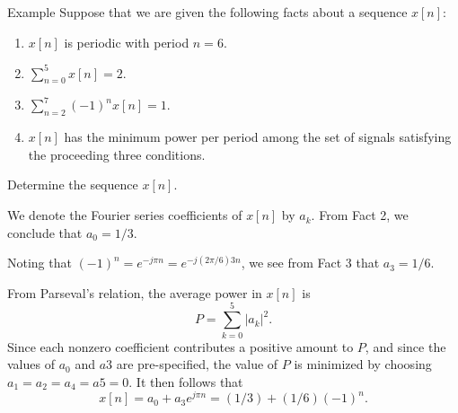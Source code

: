 \begin{frame}{Example}
    Suppose that we are given the following facts about a sequence $x[n]$:
    \begin{enumerate}
        \item $x[n]$ is periodic with period $n=6$.
        \item $\sum_{n=0}^{5}x[n] = 2$.
        \item $\sum_{n=2}^{7}(-1)^nx[n] = 1$.
        \item $x[n]$ has the minimum power per period among the set of signals satisfying the proceeding three conditions.
    \end{enumerate}
    Determine the sequence $x[n]$.
\end{frame}

\begin{frame}
    {
        We denote the Fourier series coefficients of $x[n]$ by $a_k$. From Fact 2, we conclude that $a_0 = 1/3$.\par \pause
        Noting that $(-1)^n  = e^{-j\pi n}= e^{-j(2\pi/6)3n}$, we see from Fact 3 that $a_3 = 1/6$.\par\pause From Parseval's relation, the average power in $x[n]$ is
        \begin{equation*}
            P = \sum_{k=0}^{5}|a_k|^2.
        \end{equation*}
        Since each nonzero coefficient contributes a positive amount to $P$, and since the values of $a_0$ and $a3$ are pre-specified, the value of $P$ is minimized by choosing $a_1 = a_2 = a_4 = a5 = 0$. It then follows that
        \begin{equation*}
            x[n] = a_0 + a_3 e^{j\pi n} = (1/3) + (1/6)(-1)^n.
        \end{equation*}       
    }
\end{frame}



%

